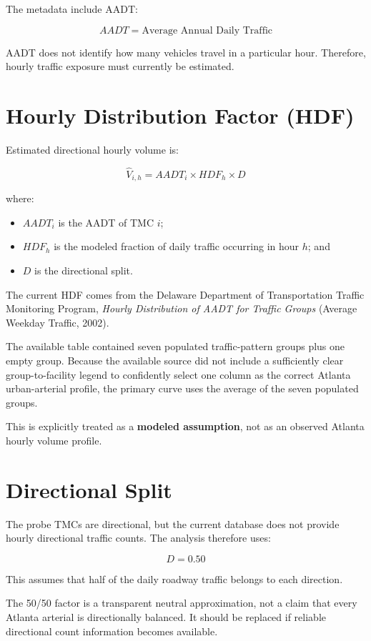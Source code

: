 \documentclass[11pt]{article}
\begin{document}
The metadata include AADT:

\[
AADT = \text{Average Annual Daily Traffic}
\]

AADT does not identify how many vehicles travel in a particular hour. Therefore, hourly traffic exposure must currently be estimated.

\section{Hourly Distribution Factor (HDF)}

Estimated directional hourly volume is:

\[
\boxed{
\hat V_{i,h} = AADT_i \times HDF_h \times D
}
\]

where:

\begin{itemize}
    \item $AADT_i$ is the AADT of TMC $i$;
    \item $HDF_h$ is the modeled fraction of daily traffic occurring in hour $h$; and
    \item $D$ is the directional split.
\end{itemize}

The current HDF comes from the Delaware Department of Transportation Traffic Monitoring Program, \emph{Hourly Distribution of AADT for Traffic Groups} (Average Weekday Traffic, 2002).

The available table contained seven populated traffic-pattern groups plus one empty group. Because the available source did not include a sufficiently clear group-to-facility legend to confidently select one column as the correct Atlanta urban-arterial profile, the primary curve uses the average of the seven populated groups.

This is explicitly treated as a \textbf{modeled assumption}, not as an observed Atlanta hourly volume profile.

\section{Directional Split}

The probe TMCs are directional, but the current database does not provide hourly directional traffic counts. The analysis therefore uses:

\[
\boxed{D = 0.50}
\]

This assumes that half of the daily roadway traffic belongs to each direction.

The 50/50 factor is a transparent neutral approximation, not a claim that every Atlanta arterial is directionally balanced. It should be replaced if reliable directional count information becomes available.
\end{document}
